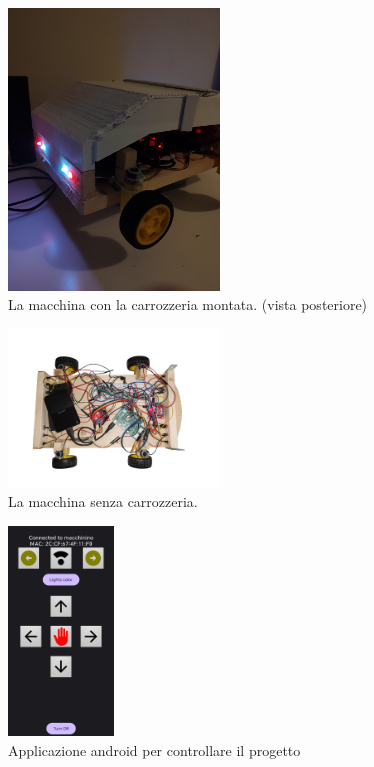 \documentclass{article}
\begin{document}
\begin{figure}[h!]
  \centering
  \includegraphics[width=0.5\textwidth]{imgs/results_2.jpeg}
  \caption{La macchina con la carrozzeria montata. (vista posteriore)}
  \label{fig:macchina_carrozzeria}
\end{figure}

\begin{figure}[h!]
  \centering
  \includegraphics[width=0.5\textwidth]{imgs/results_3.png}
  \caption{La macchina senza carrozzeria.}
  \label{fig:macchina_carrozzeria}
\end{figure}

\begin{figure}[h!]
  \centering
  \includegraphics[width=0.25\textwidth]{imgs/results_4.jpeg}
  \caption{Applicazione android per controllare il progetto}
  \label{fig:macchina_carrozzeria}
\end{figure}
\end{document}
